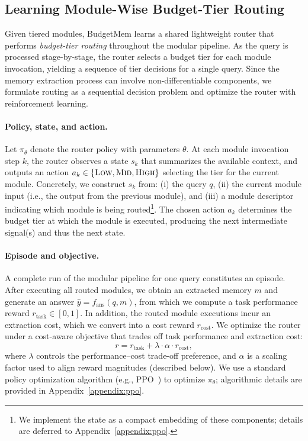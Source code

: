\subsection{Learning Module-Wise Budget-Tier Routing}
\label{sec:learn_routing}



Given tiered modules, BudgetMem learns a shared lightweight router that performs \emph{budget-tier routing} throughout the modular pipeline. As the query is processed stage-by-stage, the router selects a budget tier for each module invocation, yielding a sequence of tier decisions for a single query. Since the memory extraction process can involve non-differentiable components, we formulate routing as a sequential decision problem and optimize the router with reinforcement learning.

\paragraph{Policy, state, and action.}
Let $\pi_\theta$ denote the router policy with parameters $\theta$. At each module invocation step $k$, the router observes a state $s_k$ that summarizes the available context, and outputs an action $a_k \in \{\textsc{Low},\textsc{Mid},\textsc{High}\}$ selecting the tier for the current module.
Concretely, we construct $s_k$ from: (i) the query $q$, (ii) the current module input (i.e., the output from the previous module), and (iii) a module descriptor indicating which module is being routed\footnote{We implement the state as a compact embedding of these components; details are deferred to Appendix~\ref{appendix:ppo}. }.
The chosen action $a_k$ determines the budget tier at which the module is executed, producing the next intermediate signal(s) and thus the next state.

\paragraph{Episode and objective.}
A complete run of the modular pipeline for one query constitutes an episode. After executing all routed modules, we obtain an extracted memory $m$ and generate an answer $\hat{y}=f_{\text{ans}}(q,m)$, from which we compute a task performance reward $r_{\text{task}}\in[0,1]$.
In addition, the routed module executions incur an extraction cost, which we convert into a cost reward $r_{\text{cost}}$.
We optimize the router under a cost-aware objective that trades off task performance and extraction cost:
\begin{equation}
r = r_{\text{task}} + \lambda \cdot \alpha \cdot r_{\text{cost}},
\label{eq:total_reward}
\end{equation}
where $\lambda$ controls the performance--cost trade-off preference, and $\alpha$ is a scaling factor used to align reward magnitudes (described below).
We use a standard policy optimization algorithm (e.g., PPO~\citep{schulman2017proximal}) to optimize $\pi_\theta$; algorithmic details are provided in Appendix~\ref{appendix:ppo}.

